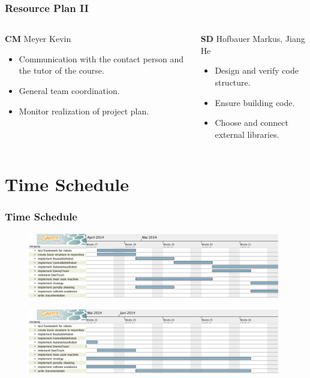\documentclass[hyperref={pdfpagelabels=false}]{beamer}
\begin{document}
\begin{frame}
	\frametitle{Resource Plan II}
	\begin{columns}[t]
		\begin{column}{0.50\textwidth}
			\begin{block}{\textbf{CM} Meyer Kevin}
				\begin{itemize}
					\item Communication with the contact person and the tutor of the course.
					\item General team coordination.
					\item Monitor realization of project plan.
				\end{itemize}
			\end{block}
		\end{column}
		
		\begin{column}{0.50\textwidth}
			\begin{block}{\textbf{SD} Hofbauer Markus, Jiang He}
				\begin{itemize}
					\item Design and verify code structure.
					\item Ensure building code.
					\item Choose and connect external libraries.
				\end{itemize}
			\end{block}
		\end{column}
	\end{columns}
\end{frame}

\section{Time Schedule} 
\begin{frame}
	\frametitle{Time Schedule} 
	\begin{figure}
		\centering
		\includegraphics[width = 0.98\textwidth]{g1}
	\end{figure}
	\begin{figure}
		\centering
		\includegraphics[width = 0.98\textwidth]{g2}
	\end{figure}
	
\end{frame}
\end{document}
